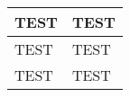 \begin{longtable}[]{@{}ll@{}}
\toprule\noalign{}
TEST & TEST \\
\midrule\noalign{}
\endhead
\bottomrule\noalign{}
\endlastfoot
TEST & TEST \\
TEST & TEST \\
\end{longtable}
